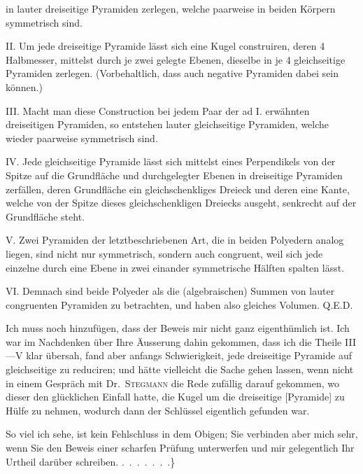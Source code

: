 %
\noindent in lauter dreiseitige Pyramiden zerlegen, welche paarweise in beiden Körpern
symmetrisch sind.

II. Um jede dreiseitige Pyramide lässt sich eine Kugel construiren, deren
4 Halbmesser, mittelst durch je zwei gelegte Ebenen, dieselbe in je 4 gleichseitige
Pyramiden zerlegen. (Vorbehaltlich, dass auch negative Pyramiden dabei sein
können.)

III. Macht man diese Construction bei jedem Paar der ad I. erwähnten
dreiseitigen Pyramiden, so entstehen lauter gleichseitige Pyramiden, welche
wieder paarweise symmetrisch sind.

IV. Jede gleichseitige Pyramide lässt sich mittelst eines Perpendikels von
der Spitze auf die Grundfläche und durchgelegter Ebenen in  dreiseitige
Pyramiden zerfällen, deren Grundfläche ein gleichschenkliges Dreieck und
deren eine Kante, welche von der Spitze dieses gleichschenkligen Dreiecks
ausgeht, senkrecht auf der Grundfläche steht.

V. Zwei Pyramiden der letztbeschriebenen Art, die in beiden Polyedern
analog liegen, sind nicht nur symmetrisch, sondern auch congruent, weil sich
jede einzelne durch eine Ebene in zwei einander symmetrische Hälften spalten
lässt.

VI. Demnach sind beide Polyeder als die (algebraischen) Summen von lauter
congruenten Pyramiden zu betrachten, und haben also gleiches Volumen. Q.E.D.

Ich muss noch hinzufügen, dass der Beweis mir nicht ganz eigenthümlich ist.
Ich war im Nachdenken über Ihre Äusserung dahin gekommen, dass ich die
Theile III---V klar übersah, fand aber anfangs Schwierigkeit, jede dreiseitige
Pyramide auf gleichseitige zu reduciren; und hätte vielleicht die Sache gehen
lassen, wenn nicht in einem Gespräch mit Dr.\ \textsc{Stegmann} die Rede zufällig
darauf gekommen, wo dieser den glücklichen Einfall hatte, die Kugel um die
dreiseitige [Pyramide] zu Hülfe zu nehmen, wodurch dann der Schlüssel eigentlich
gefunden war.

So viel ich sehe, ist kein Fehlschluss in dem Obigen; Sie verbinden aber
mich sehr, wenn Sie den Beweis einer scharfen Prüfung unterwerfen und mir
gelegentlich Ihr Urtheil darüber schreiben. \mbox{.\ .\ .\ .\ .\ .\ .}\}
